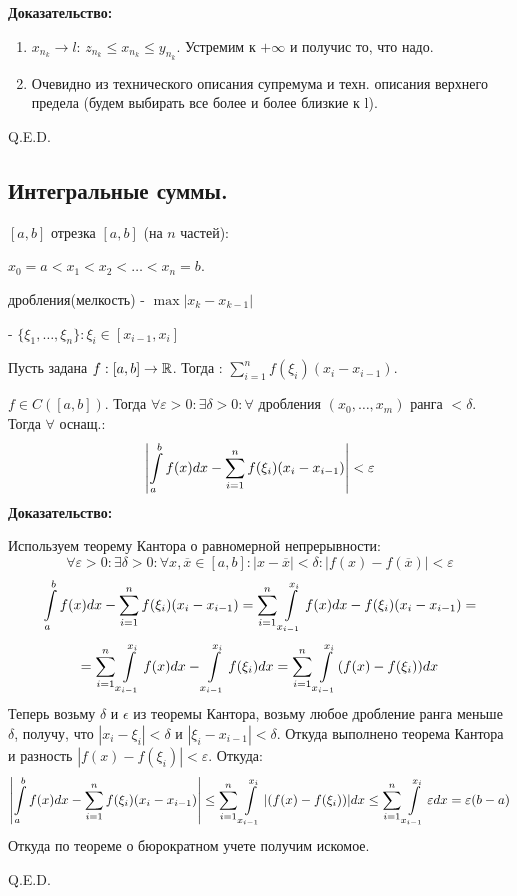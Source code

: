 \textbf{Доказательство:}

\begin{enumerate}
    \item $x_{n_k} \rightarrow l$: $z_{n_k}\leq x_{n_k}\leq y_{n_k}$. Устремим к $+\infty$ и получис то, что надо.
    \item Очевидно из технического описания супремума и техн. описания верхнего предела (будем выбирать все более и более близкие к l).
\end{enumerate}

\hfill Q.E.D.



\newpage
\subsection{Интегральные суммы.}

 $[a,b]$  отрезка $[a,b]$ (на $n$ частей):

$x_0 = a <x_1<x_2<\ldots <x_n=b$.

 дробления(мелкость) - $\max |x_k-x_{k-1}|$

 - $\{\xi_1,\ldots, \xi_n\}: \xi_i \in [x_{i-1},x_i]$

Пусть задана $f:[a,b] \rightarrow \mathbb{R}$. Тогда : $\sum\limits_{i=1}^n f(\xi_i)(x_i-x_{i-1})$.


$f\in C([a,b])$. Тогда $\forall \varepsilon >0: \exists \delta >0 : \forall$ дробления $(x_0,\ldots,x_m)$ ранга $< \delta$. Тогда $\forall$ оснащ.:
$$\left|\displaystyle\int\limits_{a}^{b}f(x)dx - \sum\limits_{i=1}^nf(\xi_i) (x_i-x_{i-1})\right|<\varepsilon$$
\textbf{Доказательство:}

Используем теорему Кантора о равномерной непрерывности: $$\forall \varepsilon> 0: \exists \delta >0: \forall x,\overline{x} \in [a,b]: |x-\overline{x}|<\delta: |f(x) - f(\overline{x})|<\varepsilon$$
$$\displaystyle\int\limits_{a}^{b}f(x)dx - \sum\limits_{i=1}^nf(\xi_i)(x_i-x_{i-1})= \sum\limits_{i=1}^n \displaystyle\int\limits_{x_{i-1}}^{x_i}f(x)dx - f(\xi_i)(x_i-x_{i-1}) = $$
$$=\sum\limits_{i=1}^n \displaystyle\int\limits_{x_{i-1}}^{x_i}f(x)dx - \displaystyle\int\limits_{x_{i-1}}^{x_i}f(\xi_i)dx  = \sum\limits_{i=1}^n \displaystyle\int\limits_{x_{i-1}}^{x_i}(f(x) - f(\xi_i))dx $$
Теперь возьму $\delta$ и $\epsilon$ из теоремы Кантора, возьму любое дробление ранга меньше $\delta$, получу, что $|x_i-\xi_i|<\delta$ и $|\xi_i- x_{i-1}|<\delta$. Откуда выполнено теорема Кантора и разность $|f(x)-f(\xi_i)|<\varepsilon$. Откуда:
$$\left|\displaystyle\int\limits_{a}^{b}f(x)dx - \sum\limits_{i=1}^nf(\xi_i) (x_i-x_{i-1})\right| \leq \sum\limits_{i=1}^n \displaystyle\int\limits_{x_{i-1}}^{x_i}|(f(x) - f(\xi_i))|dx\leq \sum\limits_{i=1}^n \displaystyle\int\limits_{x_{i-1}}^{x_i}\varepsilon dx = \varepsilon(b-a)$$
Откуда по теореме о бюрократном учете получим искомое.

\hfill Q.E.D.


